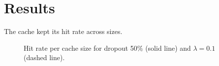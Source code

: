 \section{Results}
The cache kept its hit rate across sizes.
\begin{figure}
\caption{Hit rate per cache size for dropout 50\% (solid line) and $\lambda = 0.1$ (dashed line).}
\end{figure}
